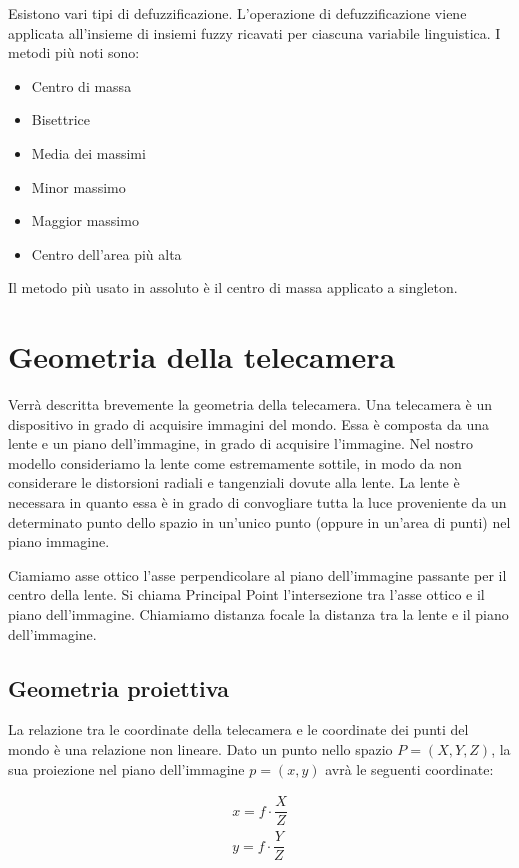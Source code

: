 Esistono vari tipi di defuzzificazione. L'operazione di defuzzificazione viene applicata all'insieme di insiemi fuzzy ricavati per ciascuna variabile linguistica. I metodi più noti sono:
\begin{itemize}
 \item Centro di massa
 \item Bisettrice
 \item Media dei massimi
 \item Minor massimo
 \item Maggior massimo
 \item Centro dell'area più alta
\end{itemize}

Il metodo più usato in assoluto è il centro di massa applicato a singleton.

\section{Geometria della telecamera}

Verrà descritta brevemente la geometria della telecamera.
Una telecamera è un dispositivo in grado di acquisire immagini del mondo. Essa è composta da una lente e un piano dell'immagine, in grado di acquisire l'immagine. Nel nostro modello consideriamo la lente come estremamente sottile, in modo da non considerare le distorsioni radiali e tangenziali dovute alla lente. La lente è necessara in quanto essa è in grado di convogliare tutta la luce proveniente da un determinato punto dello spazio in un'unico punto (oppure in un'area di punti) nel piano immagine.

Ciamiamo asse ottico l'asse perpendicolare al piano dell'immagine passante per il centro della lente. Si chiama Principal Point l'intersezione tra l'asse ottico e il piano dell'immagine.
Chiamiamo distanza focale la distanza tra la lente e il piano dell'immagine.

\subsection{Geometria proiettiva}

La relazione tra le coordinate della telecamera e le coordinate dei punti del mondo è una relazione non lineare.
Dato un punto nello spazio $P=(X,Y,Z)$, la sua proiezione nel piano dell'immagine $p=(x,y)$ avrà le seguenti coordinate:

\begin{equation*}
 \begin{aligned}
  x = f\cdot \dfrac{X}{Z} \\
  y = f\cdot \dfrac{Y}{Z}
 \end{aligned}
\end{equation*}

